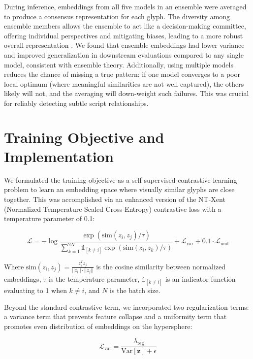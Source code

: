 \documentclass[11pt,a4paper,oneside]{report}
\begin{document}
During inference, embeddings from all five models in an ensemble were averaged to produce a consensus representation for each glyph. The diversity among ensemble members allows the ensemble to act like a decision-making committee, offering individual perspectives and mitigating biases, leading to a more robust overall representation \cite{lakshminarayanan_simple_2016}. We found that ensemble embeddings had lower variance and improved generalization in downstream evaluations compared to any single model, consistent with ensemble theory. Additionally, using multiple models reduces the chance of missing a true pattern: if one model converges to a poor local optimum (where meaningful similarities are not well captured), the others likely will not, and the averaging will down-weight such failures. This was crucial for reliably detecting subtle script relationships.

\section{Training Objective and Implementation}
\noindent\hspace{1cm}
We formulated the training objective as a self-supervised contrastive learning problem to learn an embedding space where visually similar glyphs are close together. This was accomplished via an enhanced version of the NT-Xent (Normalized Temperature-Scaled Cross-Entropy) contrastive loss \cite{chen_simple_2020} with a temperature parameter of 0.1:

\begin{equation}
\mathcal{L} = -\log\frac{\exp(\text{sim}(z_i, z_j)/\tau)}{\sum_{k=1}^{2N} \mathbb{1}_{[k \neq i]} \exp(\text{sim}(z_i, z_k)/\tau)} + \mathcal{L}_{\text{var}} + 0.1 \cdot \mathcal{L}_{\text{unif}}
\end{equation}

Where $\text{sim}(z_i, z_j) = \frac{z_i^T z_j}{||z_i|| \cdot ||z_j||}$ is the cosine similarity between normalized embeddings, $\tau$ is the temperature parameter, $\mathbb{1}_{[k \neq i]}$ is an indicator function evaluating to 1 when $k \neq i$, and $N$ is the batch size.

Beyond the standard contrastive term, we incorporated two regularization terms: a variance term that prevents feature collapse and a uniformity term that promotes even distribution of embeddings on the hypersphere:

\begin{equation}
\mathcal{L}_{\text{var}} = \frac{\lambda_{\text{reg}}}{\text{Var}[\mathbf{z}] + \epsilon}
\end{equation}
\end{document}

